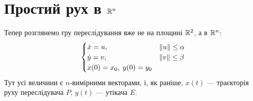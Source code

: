 \section{Простий рух в \texorpdfstring{$\mathbb{R}^n$}{Rn}}
Тепер розглянемо гру переслідування вже не на площині $\mathbb{R}^2$, а в $\mathbb{R}^n$:
\begin{gather}
    \begin{cases}
        \dot{x} = u, & \Vert u \Vert \leq \alpha \\
        \dot{y} = v, & \Vert v \Vert \leq \beta \\
        x(0) = x_0, \; y(0) = y_0
    \end{cases}
\end{gather}
Тут усі величини є $n$-вимірними векторами, і, як раніше, $x(t)$ --- траєкторія
руху переслідувача $P$, $y(t)$ --- утікача $E$.


